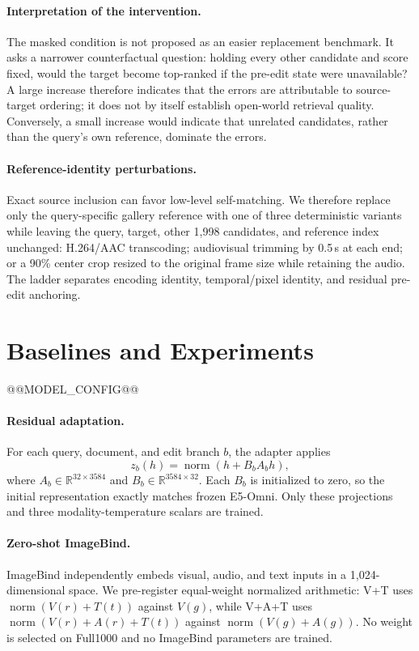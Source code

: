 \documentclass[letterpaper]{article}
\begin{document}
\paragraph{Interpretation of the intervention.}
The masked condition is not proposed as an easier replacement benchmark.
It asks a narrower counterfactual question: holding every other candidate and score fixed, would the target become top-ranked if the pre-edit state were unavailable?
A large increase therefore indicates that the errors are attributable to source-target ordering; it does not by itself establish open-world retrieval quality.
Conversely, a small increase would indicate that unrelated candidates, rather than the query's own reference, dominate the errors.

\paragraph{Reference-identity perturbations.}
Exact source inclusion can favor low-level self-matching.
We therefore replace only the query-specific gallery reference with one of three deterministic variants while leaving the query, target, other 1,998 candidates, and reference index unchanged: H.264/AAC transcoding; audiovisual trimming by 0.5\,s at each end; or a 90\% center crop resized to the original frame size while retaining the audio.
The ladder separates encoding identity, temporal/pixel identity, and residual pre-edit anchoring.

\section{Baselines and Experiments}

@@MODEL_CONFIG@@

\paragraph{Residual adaptation.}
For each query, document, and edit branch $b$, the adapter applies
\begin{equation}
  z_b(h)=\operatorname{norm}\!\left(h+B_b A_b h\right),
\end{equation}
where $A_b\!\in\!\mathbb{R}^{32\times3584}$ and
$B_b\!\in\!\mathbb{R}^{3584\times32}$.
Each $B_b$ is initialized to zero, so the initial representation exactly matches frozen E5-Omni.
Only these projections and three modality-temperature scalars are trained.

\paragraph{Zero-shot ImageBind.}
ImageBind independently embeds visual, audio, and text inputs in a 1,024-dimensional space.
We pre-register equal-weight normalized arithmetic: V+T uses
$\operatorname{norm}(V(r)+T(t))$ against $V(g)$, while V+A+T uses
$\operatorname{norm}(V(r)+A(r)+T(t))$ against
$\operatorname{norm}(V(g)+A(g))$.
No weight is selected on Full1000 and no ImageBind parameters are trained.
\end{document}
